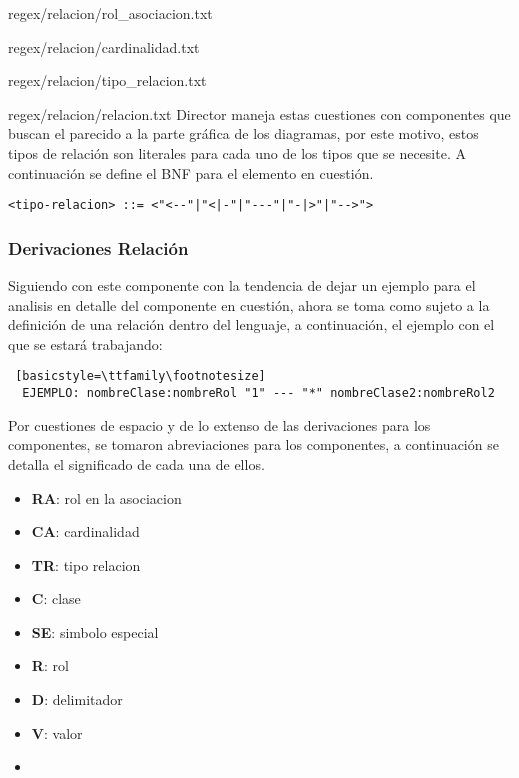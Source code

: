\begin{lstinputlisting}[basicstyle=\footnotesize\ttfamily, caption={Regex -
  Nombre clase (+Rol) [Relación]},
  label=rerenomclase]{regex/relacion/rol_asociacion.txt}
\begin{lstinputlisting}[basicstyle=\footnotesize\ttfamily, caption={Regex -
  Cardinalidad [Relación]}, label=rerecard]{regex/relacion/cardinalidad.txt}
\begin{lstinputlisting}[basicstyle=\footnotesize\ttfamily, caption={Regex -
  Tipo de Relación [Relación]},
  label=reretiprel]{regex/relacion/tipo_relacion.txt}
\begin{lstinputlisting}[basicstyle=\footnotesize\ttfamily, caption={Regex -
  Relacion},
  label=rerelacion]{regex/relacion/relacion.txt}
Director maneja estas cuestiones con componentes que buscan el parecido a la
parte gráfica de los diagramas, por este motivo, estos tipos de relación son
literales para cada uno de los tipos que se necesite. A continuación se define
el BNF para el elemento en cuestión.

\begin{lstlisting}[caption={BNF - Tipos de Relación}, basicstyle=\footnotesize\ttfamily]
	<tipo-relacion> ::= <"<--"|"<|-"|"---"|"-|>"|"-->">
\end{lstlisting}

\subsubsection{Derivaciones Relación}
Siguiendo con este componente  con la tendencia de dejar un ejemplo para el
analisis en detalle del componente en cuestión, ahora se toma como sujeto a la
definición de una relación dentro del lenguaje, a continuación, el ejemplo con
el que se estará trabajando:

\begin{lstlisting} [basicstyle=\ttfamily\footnotesize]
  EJEMPLO: nombreClase:nombreRol "1" --- "*" nombreClase2:nombreRol2
\end{lstlisting}

Por cuestiones de espacio y de lo extenso de las derivaciones para los
componentes, se tomaron abreviaciones para los componentes, a continuación
se detalla el significado de cada una de ellos.

\begin{itemize}
  \item \textbf{RA}: rol en la asociacion
  \item \textbf{CA}: cardinalidad
  \item \textbf{TR}: tipo relacion
  \item \textbf{C}: clase
  \item \textbf{SE}: simbolo especial
  \item \textbf{R}: rol
  \item \textbf{D}: delimitador
  \item \textbf{V}: valor
  \item
\end{itemize}



\end{lstinputlisting}
\end{lstinputlisting}
\end{lstinputlisting}
\end{lstinputlisting}
